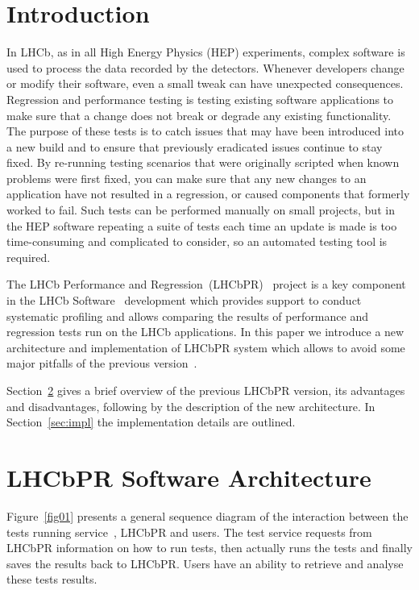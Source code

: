 \documentclass[10pt]{iopart}
\begin{document}
\section{Introduction}

In LHCb, as in all High Energy Physics (HEP) experiments, complex software is
used to process the data recorded by the detectors. Whenever developers change
or modify their software, even a small tweak can have unexpected
consequences. Regression and performance testing is testing existing software
applications to make sure that a change does not break or degrade any existing
functionality. The purpose of these tests is to catch issues that may have been
introduced into a new build and to ensure that previously eradicated issues
continue to stay fixed. By re-running testing scenarios that were originally
scripted when known problems were first fixed, you can make sure that any new
changes to an application have not resulted in a regression, or caused components
that formerly worked to fail. Such tests can be performed manually on small
projects, but in the HEP software repeating a suite of tests each time an update
is made is too time-consuming and complicated to consider, so an automated
testing tool is required. 

The LHCb Performance and Regression~(LHCbPR)~\cite{Couturier:2014mga}  project is a key
component in the LHCb Software~\cite{Corti:2006yx} development which provides
support to conduct systematic profiling and allows comparing the results of
performance and regression tests run on the LHCb applications. In this paper we
introduce a new architecture and implementation of LHCbPR system which allows to
avoid some major pitfalls of the previous version~\cite{Couturier:2014mga}.

Section~\ref{sec:arch} gives a brief overview of the previous LHCbPR version,
its advantages and disadvantages, following by the description of the
new architecture. In Section~\ref{sec:impl} the implementation details are outlined.


\section{LHCbPR Software Architecture}\label{sec:arch}

Figure~\ref{fig01} presents a general sequence diagram of the interaction between
the tests running service~\cite{Clemencic:2015glz}, LHCbPR  and users. The test service requests from
LHCbPR information on how to run tests, then actually runs the tests and finally
saves the results back to LHCbPR. Users have an ability to retrieve and analyse
these tests results.
\end{document}
